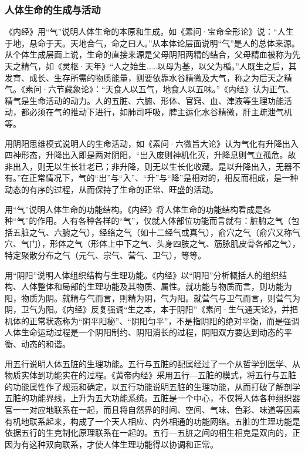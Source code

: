 \documentclass[draft,12pt]{ctexbook}
\begin{document}
\subsubsection{人体生命的生成与活动}%

《内经》用“气”说明人体生命的本原和生成。如《素问·宝命全形论》说：“人生于地，悬命于天。天地合气，命之曰人。”从本体论层面说明“气”是人的总体来源。从个体生成层面上说，生命的直接来源是父母阴阳两精的结合，父母精血被称为先天之精气，如《灵枢·天年》“人之始生……以母为基，以父为楯。”人既生之后，其发育、成长、生存所需的物质能量，则要依靠水谷精微及大气，称之为后天之精气。《素问·六节藏象论》：“天食人以五气，地食人以五味。”《内经》认为正气、精气是生命活动的动力。人的五脏、六腑、形体、官窍、血、津液等生理功能活动，都必须在气的推动下进行，如肺司呼吸，脾主运化水谷精微，肝主疏泄气机等。

用阴阳思维模式说明人的生命活动，如《素问·六微旨大论》认为气化有升降出入四神形态，升降出入即是两对阴阳，“出入废则神机化灭，升降息则气立孤危。故非出入，则无以生长壮老已；非升降，则无以生长化收藏。是以升降出入，无器不有。”在正常情况下，气的“出”与“入”、“升”与“降”是相对的，相反而相成，是一种动态的有序的过程，从而保持了生命的正常、旺盛的活动。

用“气”说明人体生命的功能结构。《内经》将人体生命的功能结构看成是各种“气”的作用。人有各种各样的“气”，仅就人体部位功能而言就有：脏腑之气（包括五脏之气、六腑之气），经络之气（如十二经气或真气），俞穴之气（俞穴又称气穴、气门），形体之气（形体上中下之气、头身四肢之气、筋脉肌皮骨各部之气），特定聚散分布之气（元气、宗气、营气、卫气），等等。

用“阴阳”说明人体组织结构与生理功能。《内经》以“阴阳”分析概括人的组织结构、人体整体和局部的生理功能及其物质、属性。就功能与物质而言，则功能为阳，物质为阴。就精与气而言，則精为阴，气为阳。就营气与卫气而言，则营气为阴，卫气为阳。《内经》反复强调“生之本，本于阴阳”《素问·生气通天论》，并把机体的正常状态称为“阴平阳秘”、“阴阳匀平”，不是指阴阳的绝对平衡，而是强调人体生命运动过程是一个阴阳制约、阴阳消长的过程，阴阳双方要达到动态的平衡、动态的和谐。

用五行说明人体五脏的生理功能。五行与五脏的配属经过了一个从哲学到医学、从物质实体到功能实在的过程。《黄帝内经》采用五行—五脏的模式，将五行与五脏的功能属性作了规范和确定，以五行功能说明五脏的生理功能，从而打破了解剖学五脏的功能界线，上升为五大功能系统。五脏是一个中心，不仅将人体各种组织器官一一对应地联系在一起，而且将自然界的时间、空间、气味、色彩、味道等因素有机地联系起来，构成了一个天人相应、内外相通的功能网络。五脏的生理功能是依据五行的生克制化原理联系在一起的。五行—五脏之间的相生相克是双向的，正因为有这种双向联系，才使人体生理功能得以协调和正常。
\end{document}
